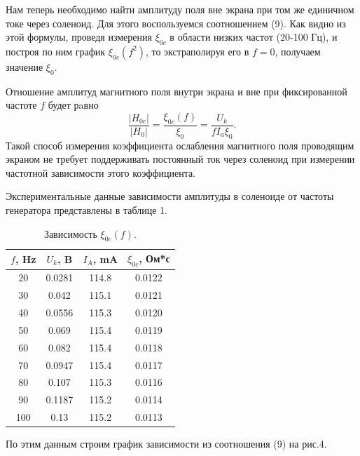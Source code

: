 \documentclass[a4paper, 14pt]{extarticle}%
\newcommand\ECaption[1]{%
     \captionsetup{font=footnotesize}%
     \caption{#1}}
\begin{document}
Нам теперь необходимо найти амплитуду поля вне экрана при том
же единичном токе через соленоид. Для этого воспользуемся соотношением (9). Как видно из этой формулы, проведя измерения $\xi_{0c}$ в области низких частот (20-100 Гц), и построя по ним график $\xi_{0c}(f^2)$, то экстраполируя его в $f=0$, получаем значение $\xi_0$. 

Отношение
амплитуд магнитного поля внутри экрана
и вне при фиксированной частоте
$f$ будет рaвно
\begin{equation}
\dfrac{|H_{0c}|}{|H_0|} = \dfrac{\xi_{0c}(f)}{\xi_0} = \dfrac{U_k}{fI_a\xi_0}.
\end{equation}
Такой способ измерения
коэффициента ослабления магнитного поля проводящим экраном не требует поддерживать постоянный ток через соленоид
при измерении частотной зависимости этого
коэффициента.

Экспериментальные данные зависимости амплитуды в соленоиде от частоты генератора представлены в таблице 1.
\begin{table}[h!]
\begin{center}
\begin{tabular}{|c|c|c|c|}
\hline
\rowcolor[HTML]{9698ED} 
$f$, Hz & $U_k$, B & $I_A$, mA & $\xi_{0c}$, Ом*с \\ \hline
20      & 0.0281   & 114.8     & 0.0122           \\ \hline
\rowcolor[HTML]{9698ED} 
30      & 0.042    & 115.1     & 0.0121           \\ \hline
40      & 0.0556   & 115.3     & 0.0120           \\ \hline
\rowcolor[HTML]{9698ED} 
50      & 0.069    & 115.4     & 0.0119           \\ \hline
60      & 0.082    & 115.4     & 0.0118           \\ \hline
\rowcolor[HTML]{9698ED} 
70      & 0.0947   & 115.4     & 0.0117           \\ \hline
80      & 0.107    & 115.3     & 0.0116           \\ \hline
\rowcolor[HTML]{9698ED} 
90      & 0.1187   & 115.2     & 0.0114           \\ \hline
100     & 0.13     & 115.2     & 0.0113           \\ \hline
\end{tabular}
\ECaption{Зависимость $\xi_{0c}(f)$. } 
\end{center}
\end{table}

По этим данным строим график зависимости из соотношения (9) на рис.4.
\end{document}
